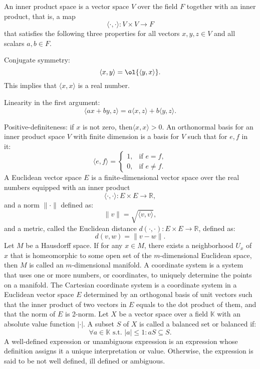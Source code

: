 \documentclass[a4paper,12pt]{report}
\begin{document}
An inner product space is a vector space $V$ over the field $F$ together with an inner product, that is, a map
\[\langle \cdot ,\cdot \rangle \colon V\times V\to F\]
that satisfies the following three properties for all vectors $x,y,z\in V$ and all scalars $a,b\in F$.
\bit
\item Conjugate symmetry: 
\[\langle x,y\rangle =\ol{\langle y,x\rangle }.\]
This implies that $\langle x,x\rangle$ is a real number.
\item Linearity in the first argument:
\[ \langle ax+by,z\rangle =a\langle x,z\rangle +b\langle y,z\rangle .\]
\item Positive-definiteness: if $x$ is not zero, then$\langle x,x\rangle >0$.
\eit
{}
An orthonormal basis for an inner product space $V$ with finite dimension is a basis for $V$ such that for $e,f$ in it:
\[\langle e,f \rangle = \begin{cases}1, & \text{if } e=f,\\0, & \text{if } e\neq f.\end{cases}\]
A Euclidean vector space $E$ is a finite-dimensional vector space over the real numbers equipped with an inner product 
\[\langle \cdot ,\cdot \rangle \colon E\times E\to\mathbb{R},\]
and a norm $\|\cdot\|$ defined as:
\[\|v\|=\sqrt{\langle v,v\rangle},\]
and a metric, called the Euclidean distance $d(\cdot,\cdot)\colon E\times E\to\mathbb{R}$, defined as:
\[d(v,w)=\|v-w\|.\]
Let $M$ be a Hausdorff space. If for any $x\in M$, there exists a neighborhood $U_x$ of $x$ that is homeomorphic to some open set of the $m$-dimensional Euclidean space, then $M$ is called an $m$-dimensional manifold.
A coordinate system is a system that uses one or more numbers, or coordinates, to uniquely determine the points on a manifold.
The Cartesian coordinate system is a coordinate system in a Euclidean vector space $E$ determined by an orthogonal basis of unit vectors such that the inner product of two vectors in $E$ equals to the dot product of them, and that the norm of $E$ is 2-norm.
Let $X$ be a vector space over a field $\mathbb{K}$ with an absolute value function $|\cdot |$. A subset $S$ of $X$ is called a balanced set or balanced if:
\[\forall a\in\mathbb{K}\text{ s.t. }|a|\leq 1\colon aS\subseteq S.\]
A well-defined expression or unambiguous expression is an expression whose definition assigns it a unique interpretation or value. Otherwise, the expression is said to be not well defined, ill defined or ambiguous.
\end{document}
